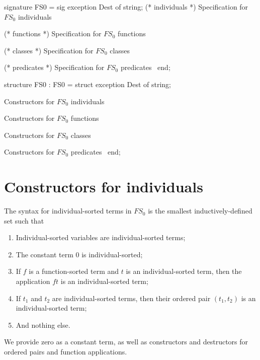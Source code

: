 \nwenddocs{}\endmoddef\nwstartdeflinemarkup\nwenddeflinemarkup
signature FS0 = sig
  exception Dest of string;
  (* individuals *)
  \LA{}Specification for $FS_{0}$ individuals~{\nwtagstyle{}}\RA{}

  (* functions *)
  \LA{}Specification for $FS_{0}$ functions~{\nwtagstyle{}}\RA{}

  (* classes *)
  \LA{}Specification for $FS_{0}$ classes~{\nwtagstyle{}}\RA{}

  (* predicates *)
  \LA{}Specification for $FS_{0}$ predicates~{\nwtagstyle{}}\RA{}
end;
\nwendcode{}\nwdocspar

\nwenddocs{}\endmoddef\nwstartdeflinemarkup\nwenddeflinemarkup
structure FS0 : FS0 = struct
exception Dest of string;

\LA{}Constructors for $FS_{0}$ individuals~{\nwtagstyle{}}\RA{}

\LA{}Constructors for $FS_{0}$ functions~{\nwtagstyle{}}\RA{}

\LA{}Constructors for $FS_{0}$ classes~{\nwtagstyle{}}\RA{}

\LA{}Constructors for $FS_{0}$ predicates~{\nwtagstyle{}}\RA{}
end;
\nwendcode{}\nwdocspar

\section*{Constructors for individuals}

\begin{node}
The syntax for individual-sorted terms in $FS_{0}$ is the smallest
inductively-defined set such that
\begin{enumerate}
\item Individual-sorted variables are individual-sorted terms;
\item The constant term $0$ is individual-sorted;
\item If $f$ is a function-sorted term and $t$ is an individual-sorted
  term, then the application $ft$ is an individual-sorted term;
\item If $t_{1}$ and $t_{2}$ are individual-sorted terms, then their
  ordered pair $(t_{1},t_{2})$ is an individual-sorted term;
\item And nothing else.
\end{enumerate}
We provide {\Tt{}zero\nwendquote} as a constant term, as well as constructors and
destructors for ordered {\Tt{}pair\nwendquote}s and function {\Tt{}app\nwendquote}lications.
\end{node}

